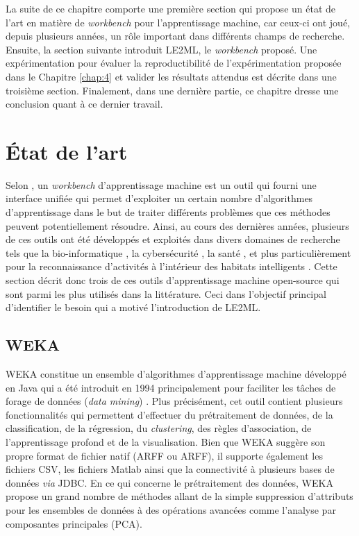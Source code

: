 La suite de ce chapitre comporte une première section qui propose un état de l'art en matière de \textit{workbench} pour l'apprentissage machine, car ceux-ci ont joué, depuis plusieurs années, un rôle important dans différents champs de recherche. Ensuite, la section suivante introduit \acs{LE2ML}, le \textit{workbench} proposé. Une expérimentation pour évaluer la reproductibilité de l'expérimentation proposée dans le Chapitre \ref{chap:4} et valider les résultats attendus est décrite dans une troisième section. Finalement, dans une dernière partie, ce chapitre dresse une conclusion quant à ce dernier travail.

\section{État de l'art}

Selon \cite{Langlois2008}, un \textit{workbench} d'apprentissage machine est un outil qui fourni une interface unifiée qui permet d'exploiter un certain nombre d'algorithmes d'apprentissage dans le but de traiter différents problèmes que ces méthodes peuvent potentiellement résoudre. Ainsi, au cours des dernières années, plusieurs de ces outils ont été développés et exploités dans divers domaines de recherche tels que la bio-informatique \citep{Larranaga2006}, la cybersécurité \citep{Handa2019}, la santé \citep{Rajkomar2019}, et plus particulièrement pour la reconnaissance d'activités à l'intérieur des habitats intelligents \citep{Ramirez-Prado2019}. Cette section décrit donc trois de ces outils d'apprentissage machine open-source qui sont parmi les plus utilisés dans la littérature. Ceci dans l'objectif principal d'identifier le besoin qui a motivé l'introduction de \acs{LE2ML}.

\subsection{WEKA}

\acs{WEKA} constitue un ensemble d'algorithmes d'apprentissage machine développé en Java qui a été introduit en 1994 principalement pour faciliter les tâches de forage de données (\textit{data mining}) \citep{Holmes1994}. Plus précisément, cet outil contient plusieurs fonctionnalités qui permettent d'effectuer du prétraitement de données, de la classification, de la régression, du \textit{clustering}, des règles d'association, de l'apprentissage profond et de la visualisation. Bien que \acs{WEKA} suggère son propre format de fichier natif (\acl{ARFF} ou \acs{ARFF}), il supporte également les fichiers \acs{CSV}, les fichiers Matlab ainsi que la connectivité à plusieurs bases de données \textit{via} \ac{JDBC}. En ce qui concerne le prétraitement des données, \acs{WEKA} propose un grand nombre de méthodes allant de la simple suppression d'attributs pour les ensembles de données à des opérations avancées comme l'analyse par composantes principales (\acs{PCA}).

